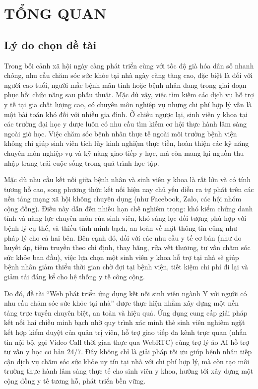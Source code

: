 \documentclass[13pt,a4paper]{extreport}
\begin{document}
\newpage

\chapter{TỔNG QUAN}

\section{Lý do chọn đề tài}
Trong bối cảnh xã hội ngày càng phát triển cùng với tốc độ già hóa dân số nhanh chóng, nhu cầu chăm sóc sức khỏe tại nhà ngày càng tăng cao, đặc biệt là đối với người cao tuổi, người mắc bệnh mãn tính hoặc bệnh nhân đang trong giai đoạn phục hồi chức năng sau phẫu thuật. Mặc dù vậy, việc tìm kiếm các dịch vụ hỗ trợ y tế tại gia chất lượng cao, có chuyên môn nghiệp vụ nhưng chi phí hợp lý vẫn là một bài toán khó đối với nhiều gia đình. Ở chiều ngược lại, sinh viên y khoa tại các trường đại học y dược luôn có nhu cầu tìm kiếm cơ hội thực hành lâm sàng ngoài giờ học. Việc chăm sóc bệnh nhân thực tế ngoài môi trường bệnh viện không chỉ giúp sinh viên tích lũy kinh nghiệm thực tiễn, hoàn thiện các kỹ năng chuyên môn nghiệp vụ và kỹ năng giao tiếp y học, mà còn mang lại nguồn thu nhập trang trải cuộc sống trong quá trình học tập.

Mặc dù nhu cầu kết nối giữa bệnh nhân và sinh viên y khoa là rất lớn và có tính tương hỗ cao, song phương thức kết nối hiện nay chủ yếu diễn ra tự phát trên các nền tảng mạng xã hội không chuyên dụng (như Facebook, Zalo, các hội nhóm cộng đồng). Điều này dẫn đến nhiều hạn chế nghiêm trọng: khó kiểm chứng danh tính và năng lực chuyên môn của sinh viên, khó sàng lọc đối tượng phù hợp với bệnh lý cụ thể, và thiếu tính minh bạch, an toàn về mặt thông tin cũng như pháp lý cho cả hai bên. Bên cạnh đó, đối với các nhu cầu y tế cơ bản (như đo huyết áp, tiêm truyền theo chỉ định, thay băng, rửa vết thương, tư vấn chăm sóc sức khỏe ban đầu), việc lựa chọn một sinh viên y khoa hỗ trợ tại nhà sẽ giúp bệnh nhân giảm thiểu thời gian chờ đợi tại bệnh viện, tiết kiệm chi phí đi lại và giảm tải đáng kể cho hệ thống y tế công cộng.

Do đó, đề tài ``Web phát triển ứng dụng kết nối sinh viên ngành Y với người có nhu cầu chăm sóc sức khỏe tại nhà'' được thực hiện nhằm xây dựng một nền tảng trực tuyến chuyên biệt, an toàn và hiệu quả. Ứng dụng cung cấp giải pháp kết nối hai chiều minh bạch nhờ quy trình xác minh thẻ sinh viên nghiêm ngặt kết hợp kiểm duyệt của quản trị viên, hỗ trợ giao tiếp đa kênh trực quan (nhắn tin nội bộ, gọi Video Call thời gian thực qua WebRTC) cùng trợ lý ảo AI hỗ trợ tư vấn y học cơ bản 24/7. Đây không chỉ là giải pháp tối ưu giúp bệnh nhân tiếp cận dịch vụ chăm sóc sức khỏe uy tín tại nhà với chi phí hợp lý, mà còn tạo môi trường thực hành lâm sàng thực tế cho sinh viên y khoa, hướng tới xây dựng một cộng đồng y tế tương hỗ, phát triển bền vững.
\end{document}
